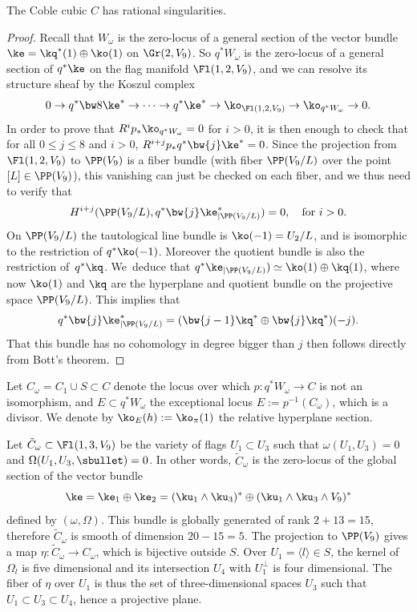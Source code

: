 \begin{prop}\label{coblerat}
The Coble cubic $C$ has rational singularities.
\end{prop}

\begin{proof}
Recall that $W_\omega$ is the zero-locus of a general section of the vector bundle $\ke=\kq^*(1)\oplus \ko(1)$ on $\Gr(2,V_9)$. So $q^*W_\omega$ is the zero-locus of a general
section of $q^*\ke$ on the flag manifold $\Fl(1,2,V_9)$, and we can resolve its structure
sheaf by the Koszul complex\enlargethispage{-1.5\baselineskip}%
\[
0\to q^*\bw8\ke^*\to\cdots\to q^*\ke^*\to \ko_{\Fl(1,2,V_9)}\to\ko_{q^*W_\omega}\to 0.
\]
In order to prove that $R^ip_{*}\ko_{q^*W_\omega}=0$ for $i>0$, it is then enough to check
that for all $0\le j\le 8$ and $i>0$, $R^{i+j}p_{*}q^*\bw{j}\ke^*=0$. Since the
projection from $\Fl(1,2,V_9)$ to $\PP(V_9)$ is a fiber bundle (with fiber $\PP(V_9/L)$ over the
point $[L]\in \PP(V_9)$), this vanishing can just be checked on each fiber, and we thus
need to verify that
\[
H^{i+j}(\PP(V_9/L), q^*\bw{j}\ke^*_{|\PP(V_9/L)})=0, \quad\text{for } i>0.
\]
On $\PP(V_9/L)$ the tautological line bundle is $\ko(-1)=U_2/L$, and is isomorphic to the restriction of $q^*\ko(-1)$. Moreover the quotient bundle is also the restriction of~$q^*\kq$.
We~deduce that $q^*\ke_{|\PP(V_9/L)})\simeq \ko(1)\oplus \kq(1)$, where now $\ko(1)$ and $\kq$
are the hyperplane and quotient bundle on the projective space $\PP(V_9/L)$. This implies that
\[
q^*\bw{j}\ke^*_{|\PP(V_9/L)}=(\bw{j-1}\kq^*\oplus \bw{j}\kq^*)(-j).
\]
That this bundle has no cohomology in degree bigger than $j$ then follows directly from
Bott's theorem.
\end{proof}

Let $C_\omega=C_1\cup S\subset C$ denote the locus over which $p: q^* W_{\omega} \to C$ is not an
isomorphism, and $E \subset q^* W_\omega$ the exceptional locus $E:=p^{-1}(C_\omega)$, which is
a divisor. We denote by $\ko_E(h):=\ko_\pi(1)$ the relative hyperplane section.

Let $\tilde C_\omega\subset
\Fl(1,3,V_9)$ be the variety of flags $U_1\subset U_3$ such that $\omega(U_1,U_3)=0$ and
$\Omega(U_1,U_3,\sbullet)=0$. In other words, $\tilde C_\omega$ is the zero-locus of the
global section of the vector bundle \[
\ke=\ke_1\oplus\ke_2=(\ku_1\wedge \ku_3)^*\oplus (\ku_1\wedge \ku_3\wedge V_9)^*
\]
defined by $(\omega, \Omega)$.
This bundle is globally generated of rank $2+13=15$, therefore $\tilde C_\omega$ is smooth
of dimension $20-15=5$. The projection to $\PP (V_9)$ gives a map $\eta : \tilde C_\omega\to C_\omega$,
which is bijective outside $S$.
Over $U_1=\langle l\rangle\in S$, the kernel of $\Omega_l$ is five
dimensional and its intersection $U_4$ with $U_1^\perp$ is four dimensional.
The fiber of $\eta$ over $U_1$ is thus the set of three-dimensional spaces $U_3$
such that $U_1\subset U_3\subset U_4$,
hence a projective plane.

